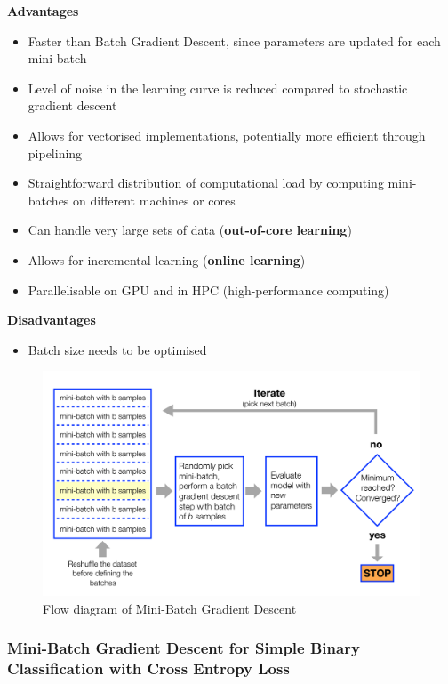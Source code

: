 \documentclass[11pt]{article}
\begin{document}
\noindent
\textbf{Advantages}
\begin{itemize}
	\item Faster than Batch Gradient Descent, since parameters are updated for each mini-batch
	\item Level of noise in the learning curve is reduced compared to stochastic gradient descent
	\item Allows for vectorised implementations, potentially more efficient through pipelining
	\item Straightforward distribution of computational load by computing mini-batches on different machines or cores
	\item Can handle very large sets of data (\textbf{out-of-core learning})
	\item Allows for incremental learning (\textbf{online learning})
	\item Parallelisable on GPU and in HPC (high-performance computing)
\end{itemize}

\noindent
\textbf{Disadvantages}
\begin{itemize}
\item Batch size needs to be optimised
\end{itemize}

\begin{figure}[htb]
	\centering
	\includegraphics[width=0.7\linewidth, keepaspectratio]{img/mini_batch_gradient_descent_flow}
	\caption{Flow diagram of Mini-Batch Gradient Descent}
	\label{fig:minibatchgradientdescentflow}
\end{figure}

\subsubsection{Mini-Batch Gradient Descent for Simple Binary Classification with Cross Entropy Loss}
\end{document}
